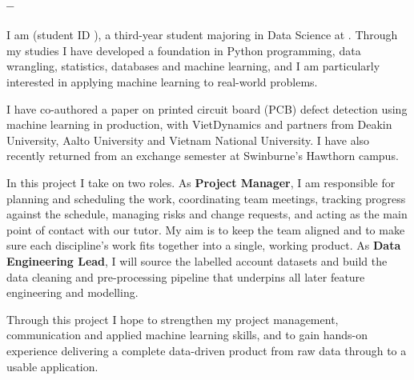 \subsubsection{\memberOne{} -- \memberOneDiscipline}

I am \memberOne{} (student ID \memberOneID), a third-year student majoring in Data Science at \institution. Through my studies I have developed a foundation in Python programming, data wrangling, statistics, databases and machine learning, and I am particularly interested in applying machine learning to real-world problems.

I have co-authored a paper on printed circuit board (PCB) defect detection using machine learning in production, with VietDynamics and partners from Deakin University, Aalto University and Vietnam National University. I have also recently returned from an exchange semester at Swinburne's Hawthorn campus.

In this project I take on two roles. As \textbf{Project Manager}, I am responsible for planning and scheduling the work, coordinating team meetings, tracking progress against the schedule, managing risks and change requests, and acting as the main point of contact with our tutor. My aim is to keep the team aligned and to make sure each discipline's work fits together into a single, working product. As \textbf{Data Engineering Lead}, I will source the labelled account datasets and build the data cleaning and pre-processing pipeline that underpins all later feature engineering and modelling.

Through this project I hope to strengthen my project management, communication and applied machine learning skills, and to gain hands-on experience delivering a complete data-driven product from raw data through to a usable application.

